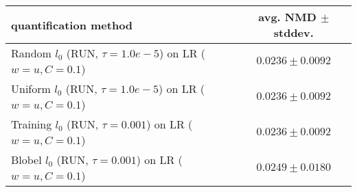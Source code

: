 \begin{tabular}{lc}
  \toprule
  quantification method & avg. NMD $\pm$ stddev. \\
  \midrule
  Random $l_0$ (RUN, $\tau=1.0e-5$) on LR ($w=u, C=0.1$) & $\mathbf{0.0236 \pm 0.0092}$ \\
  Uniform $l_0$ (RUN, $\tau=1.0e-5$) on LR ($w=u, C=0.1$) & $\mathbf{0.0236 \pm 0.0092}$ \\
  Training $l_0$ (RUN, $\tau=0.001$) on LR ($w=u, C=0.1$) & $0.0236 \pm 0.0092$ \\
  Blobel $l_0$ (RUN, $\tau=0.001$) on LR ($w=u, C=0.1$) & $0.0249 \pm 0.0180$ \\
  \bottomrule
\end{tabular}
